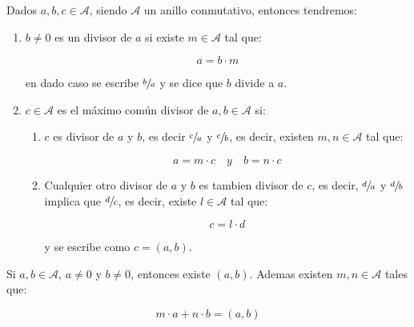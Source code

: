         \begin{definicion}
            Dados $a, b, c \in \mathcal{A}$, siendo $\mathcal{A}$ un anillo conmutativo, entonces tendremos:

            \begin{enumerate}
                \item $b \ne 0$ es un divisor de $a$ si existe $m \in \mathcal{A}$ tal que:

                \begin{equation*}
                    a = b \cdot m
                \end{equation*}

                en dado caso se escribe $\sfrac{b}{a}$ y se dice que $b$ divide a $a$.

                \item $c \in \mathcal{A}$ es el máximo común divisor de $a, b \in \mathcal{A}$ si:

                \begin{enumerate}
                    \item $c$ es divisor de $a$ y $b$, es decir $\sfrac{c}{a}$ y $\sfrac{c}{b}$, es decir, existen $m, n \in \mathcal{A}$ tal que:

                    \begin{equation*}
                        a = m \cdot c \quad y \quad b = n \cdot c
                    \end{equation*}

                    \item Cualquier otro divisor de $a$ y $b$ es tambien divisor de $c$, es decir, $\sfrac{d}{a}$ y $\sfrac{d}{b}$ implica que $\sfrac{d}{c}$, es decir, existe $l \in \mathcal{A}$ tal que:

                    \begin{equation*}
                        c = l \cdot d
                    \end{equation*}

                    y se escribe como $c = (a, b)$.
                \end{enumerate}
            \end{enumerate}
        \end{definicion}

        \begin{lema}
            Si $a, b \in \mathcal{A}$, $a \ne 0$ y $b \ne 0$, entonces existe $(a, b)$. Ademas existen $m, n \in \mathcal{A}$ tales que:

            \begin{equation}
                m \cdot a + n \cdot b = (a, b)
            \end{equation}
        \end{lema}


